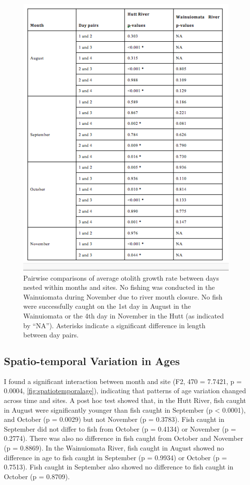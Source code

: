 \documentclass[]{book}
\begin{document}
\begin{figure}
\centering
\includegraphics{images/spatiotemp2table.png}
\caption{\label{fig:spatiotemptable2}Pairwise comparisons of average otolith
growth rate between days nested within months and sites. No fishing was
conducted in the Wainuiomata during November due to river mouth closure.
No fish were successfully caught on the 1st day in August in the
Wainuiomata or the 4th day in November in the Hutt (as indicated by
``NA''). Asterisks indicate a significant difference in length between
day pairs.}
\end{figure}

\subsection{Spatio-temporal Variation in
Ages}\label{spatio-temporal-variation-in-ages}

I found a significant interaction between month and site (F2, 470 =
7.7421, p = 0.0004, \ref{fig:spatiotemporalage}), indicating that
patterns of age variation changed across time and sites. A post hoc test
showed that, in the Hutt River, fish caught in August were significantly
younger than fish caught in September (p \textless{} 0.0001), and
October (p = 0.0029) but not November (p = 0.3783). Fish caught in
September did not differ to fish from October (p = 0.4134) or November
(p = 0.2774). There was also no difference in fish caught from October
and November (p = 0.8869). In the Wainuiomata River, fish caught in
August showed no difference in age to fish caught in September (p =
0.9934) or October (p = 0.7513). Fish caught in September also showed no
difference to fish caught in October (p = 0.8709).
\end{document}
